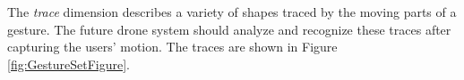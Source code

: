 \documentclass{sigchi}
\begin{document}
The {\it trace} dimension describes a variety of shapes traced by the moving parts of a gesture. The future drone system should analyze and recognize these traces after capturing the users' motion. The traces are shown in Figure \ref{fig:GestureSetFigure}.



\end{document}
